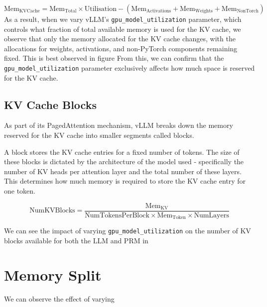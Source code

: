 \documentclass[12pt,twoside]{report}
\begin{document}
\begin{equation*}
  \text{Mem}_{\text{KVCache}} = \text{Mem}_{\text{Total}} \times \text{Utilisation} - (\text{Mem}_{\text{Activations}} + \text{Mem}_{\text{Weights}} + \text{Mem}_{\text{NonTorch}})
\end{equation*}
As a result, when we vary vLLM’s \texttt{gpu\_model\_utilization} parameter, which controls what fraction of total available memory is used for the KV cache, we observe that only the memory allocated for the KV cache changes, with the allocations for weights, activations, and non-PyTorch components remaining fixed.
This is best observed in figure %
From this, we can confirm that the \texttt{gpu\_model\_utilization} parameter exclusively affects how much space is reserved for the KV cache. %

\subsection{KV Cache Blocks}
As part of its PagedAttention mechanism, vLLM breaks down the memory reserved for the KV cache into smaller segments called blocks.

A block stores the KV cache entries for a fixed number of tokens.
The size of these blocks is dictated by the architecture of the model used - specifically the number of KV heads per attention layer and the total number of these layers.
This determines how much memory is required to store the KV cache entry for one token.

\begin{equation*}
  \text{NumKVBlocks} = \frac{\text{Mem}_{\text{KV}}}{\text{NumTokensPerBlock} \times \text{Mem}_{\text{Token}} \times \text{NumLayers}}
\end{equation*}

We can see the impact of varying \texttt{gpu\_model\_utilization} on the number of KV blocks available for both the LLM and PRM in %

\section{Memory Split}
\begin{comment}
  - i think it would be cool if i could explain where the 0.3 thing comes from in terms of theory/number of blocks
\end{comment}

We can observe the effect of varying 
\end{document}
